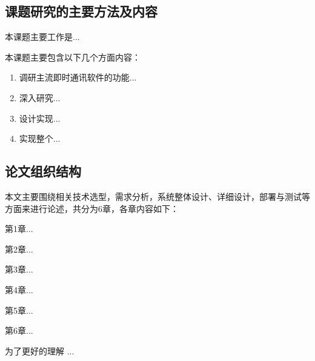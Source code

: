   	\subsection{课题研究的主要方法及内容}

 	本课题主要工作是...

  	本课题主要包含以下几个方面内容：
  
  	\begin{enumerate}
  
    \item 调研主流即时通讯软件的功能...
    
    \item 深入研究...
    
    \item 设计实现...

    \item 实现整个...
    
  	\end{enumerate}

  	\subsection{论文组织结构}
  
  	本文主要围绕相关技术选型，需求分析，系统整体设计、详细设计，部署与测试等方面来进行论述，共分为6章，各章内容如下：
	
	第1章...
	
    第2章...
    
    第3章...
    
    第4章... 
       
    第5章...
    
    第6章...
    
    为了更好的理解 ...
    
\clearpage